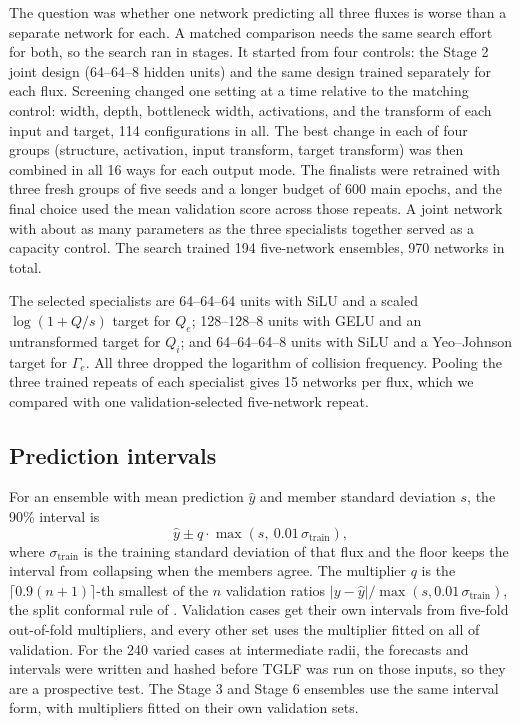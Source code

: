 \documentclass[12pt,letterpaper]{article}
\begin{document}
The question was whether one network predicting all three fluxes is worse than a separate
network for each. A matched comparison needs the same search effort for both, so the search
ran in stages. It started from four controls: the Stage 2 joint design (64--64--8 hidden units) and the
same design trained separately for each flux. Screening changed one setting at a time
relative to the matching control: width, depth, bottleneck width, activations, and the
transform of each input and target, 114 configurations in all. The best change in each of
four groups (structure, activation, input transform, target transform) was then combined in
all 16 ways for each output mode. The finalists were retrained with three fresh groups of
five seeds and a longer budget of 600 main epochs, and the final choice used the mean
validation score across those repeats. A joint network with about as many parameters as the three specialists
together served as a capacity control. The search trained 194 five-network ensembles,
970 networks in total.

The selected specialists are 64--64--64 units with SiLU and a scaled $\log(1+Q/s)$ target
for $Q_e$; 128--128--8 units with GELU and an untransformed target for $Q_i$; and
64--64--64--8 units with SiLU and a Yeo--Johnson target for $\Gamma_e$. All three dropped
the logarithm of collision frequency. Pooling the three trained repeats of each specialist
gives 15 networks per flux, which we compared with one validation-selected five-network
repeat.

\subsection{Prediction intervals}
\label{sec:meth-intervals}

For an ensemble with mean prediction $\hat{y}$ and member standard deviation $s$, the 90\%
interval is
\begin{equation}
  \hat{y} \pm q \cdot \max\left(s,\ 0.01\,\sigma_{\text{train}}\right),
  \label{eq:interval}
\end{equation}
where $\sigma_{\text{train}}$ is the training standard deviation of that flux and the floor
keeps the interval from collapsing when the members agree. The multiplier $q$ is the
$\lceil 0.9(n+1) \rceil$-th smallest of the $n$ validation ratios
$|y-\hat{y}|/\max(s, 0.01\,\sigma_{\text{train}})$, the split conformal rule of
\citet{lei2018}. Validation cases get their own intervals from five-fold out-of-fold
multipliers, and every other set uses the multiplier fitted on all of validation. For the
240 varied cases at intermediate radii, the forecasts and intervals were written and
hashed before TGLF was run on those inputs, so they are a prospective test. The Stage 3 and
Stage 6 ensembles use the same interval form, with multipliers fitted on their own validation
sets.
\end{document}
